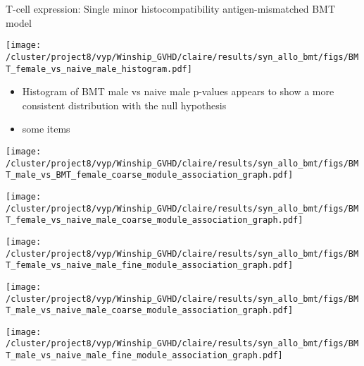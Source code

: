 \documentclass[final,hyperref={pdfpagelabels=false}]{beamer}
\begin{document}
\begin{frame}{}
\begin{columns}[t]
\begin{column}{.25\linewidth}
\begin{block}{T-cell expression: Single minor histocompatibility antigen-mismatched BMT model}
\begin{minipage}{0.45\textwidth}
            \texttt{[image: /cluster/project8/vyp/Winship\_GVHD/claire/results/syn\_allo\_bmt/figs/BMT\_female\_vs\_naive\_male\_histogram.pdf]}
          \end{minipage}
{\small	  \begin{itemize}
	    \item Histogram of BMT male vs naive male p-values appears to show a more consistent distribution with the null hypothesis 
	    \item some items
	   \end{itemize}}
	  \begin{minipage}{0.45\textwidth}
            \texttt{[image: /cluster/project8/vyp/Winship\_GVHD/claire/results/syn\_allo\_bmt/figs/BMT\_male\_vs\_BMT\_female\_coarse\_module\_association\_graph.pdf]}
          \end{minipage}
          \begin{minipage}{0.45\textwidth}
            \texttt{[image: /cluster/project8/vyp/Winship\_GVHD/claire/results/syn\_allo\_bmt/figs/BMT\_female\_vs\_naive\_male\_coarse\_module\_association\_graph.pdf]}
          \end{minipage}
	  \begin{minipage}{0.45\textwidth}
            \texttt{[image: /cluster/project8/vyp/Winship\_GVHD/claire/results/syn\_allo\_bmt/figs/BMT\_female\_vs\_naive\_male\_fine\_module\_association\_graph.pdf]}
          \end{minipage}
          \begin{minipage}{0.45\textwidth}
            \texttt{[image: /cluster/project8/vyp/Winship\_GVHD/claire/results/syn\_allo\_bmt/figs/BMT\_male\_vs\_naive\_male\_coarse\_module\_association\_graph.pdf]}
          \end{minipage}
	  \begin{minipage}{0.45\textwidth}
            \texttt{[image: /cluster/project8/vyp/Winship\_GVHD/claire/results/syn\_allo\_bmt/figs/BMT\_male\_vs\_naive\_male\_fine\_module\_association\_graph.pdf]}
          \end{minipage}
        \end{block}
      \end{column}



\end{columns}
\end{frame}
\end{document}
